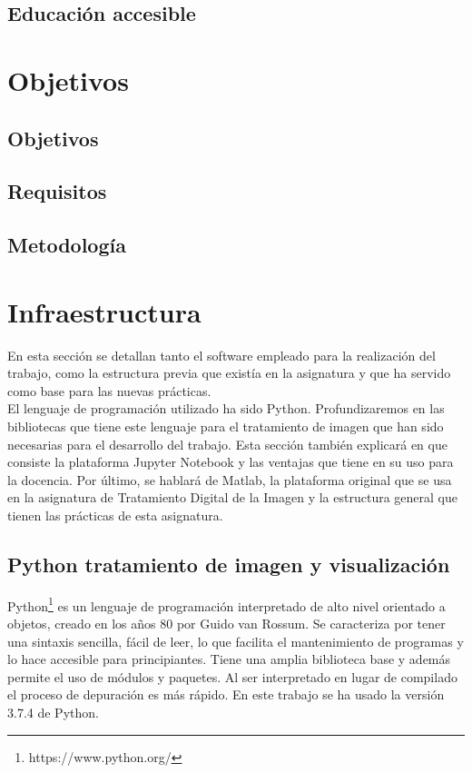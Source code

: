 \documentclass[a4paper,12pt]{report}
\begin{document}
\section{Educación accesible}


\chapter{Objetivos}

\section{Objetivos}

\section{Requisitos}

\section{Metodología}


\chapter{Infraestructura}

En esta sección se detallan tanto el software empleado para la realización del trabajo, como la estructura previa que existía en la asignatura y que ha servido como base para las nuevas prácticas. \\

 El lenguaje de programación utilizado ha sido Python. Profundizaremos en las bibliotecas que tiene este lenguaje para el tratamiento de imagen que han sido necesarias para el desarrollo del trabajo. Esta sección también explicará en que consiste la plataforma Jupyter Notebook y las ventajas que tiene en su uso para la docencia. Por último, se hablará de Matlab, la plataforma original que se usa en la asignatura de Tratamiento Digital de la Imagen y la estructura general que tienen las prácticas de esta asignatura.

\section{Python tratamiento de imagen y visualización}

Python\footnote{https://www.python.org/} es un lenguaje de programación interpretado de alto nivel orientado a objetos, creado en los años 80 por Guido van Rossum. Se caracteriza por tener una sintaxis sencilla, fácil de leer, lo que facilita el mantenimiento de programas y lo hace accesible para principiantes. Tiene una amplia biblioteca base y además permite el uso de módulos y paquetes. Al ser interpretado en lugar de compilado el proceso de depuración es más rápido. En este trabajo se ha usado la versión 3.7.4 de Python.\\
\end{document}
